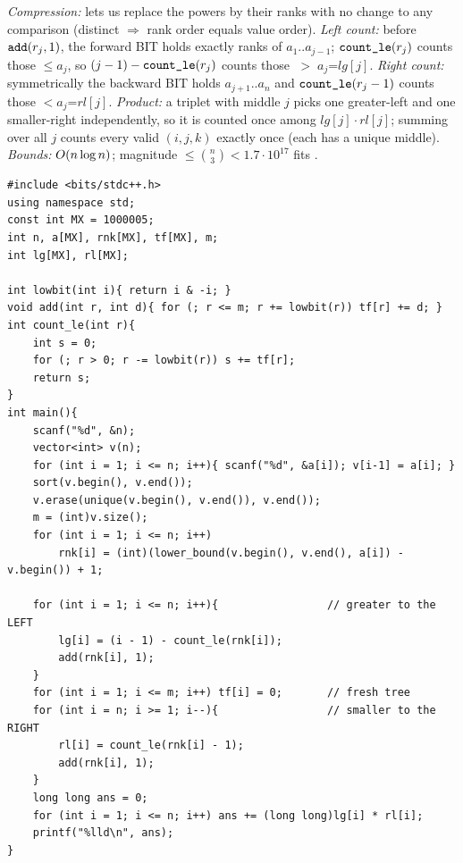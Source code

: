 \begin{proofbox}
\emph{Compression:}  lets us replace the powers by
their ranks with no change to any comparison (distinct \(\Rightarrow\) rank
order equals value order).  \emph{Left count:} before \(\texttt{add}(r_j,1)\),
the forward BIT holds exactly ranks of \(a_1..a_{j-1}\); \(\texttt{count\_le}(r_j)\)
counts those \(\le a_j\), so \((j-1)-\texttt{count\_le}(r_j)\) counts those
\(\;>\;a_j\)=\(\mathit{lg}[j]\).  \emph{Right count:} symmetrically the
backward BIT holds \(a_{j+1}..a_n\) and \(\texttt{count\_le}(r_j-1)\) counts
those \(<a_j\)=\(\mathit{rl}[j]\).  \emph{Product:} a triplet with middle
\(j\) picks one greater-left and one smaller-right independently, so it is
counted once among \(\mathit{lg}[j]\cdot\mathit{rl}[j]\); summing over all
\(j\) counts every valid \((i,j,k)\) exactly once (each has a unique middle).
\emph{Bounds:} \(O(n\log n)\); magnitude \(\le\binom{n}{3}<1.7\cdot10^{17}\)
fits .
\end{proofbox}

\begin{lstlisting}[caption={CF 61E full solution: two frequency-BIT sweeps around the middle index}, label={lst:c14-61-soln}]
#include <bits/stdc++.h>
using namespace std;
const int MX = 1000005;
int n, a[MX], rnk[MX], tf[MX], m;
int lg[MX], rl[MX];

int lowbit(int i){ return i & -i; }
void add(int r, int d){ for (; r <= m; r += lowbit(r)) tf[r] += d; }
int count_le(int r){
    int s = 0;
    for (; r > 0; r -= lowbit(r)) s += tf[r];
    return s;
}
int main(){
    scanf("%d", &n);
    vector<int> v(n);
    for (int i = 1; i <= n; i++){ scanf("%d", &a[i]); v[i-1] = a[i]; }
    sort(v.begin(), v.end());
    v.erase(unique(v.begin(), v.end()), v.end());
    m = (int)v.size();
    for (int i = 1; i <= n; i++)
        rnk[i] = (int)(lower_bound(v.begin(), v.end(), a[i]) - v.begin()) + 1;

    for (int i = 1; i <= n; i++){                 // greater to the LEFT
        lg[i] = (i - 1) - count_le(rnk[i]);
        add(rnk[i], 1);
    }
    for (int i = 1; i <= m; i++) tf[i] = 0;       // fresh tree
    for (int i = n; i >= 1; i--){                 // smaller to the RIGHT
        rl[i] = count_le(rnk[i] - 1);
        add(rnk[i], 1);
    }
    long long ans = 0;
    for (int i = 1; i <= n; i++) ans += (long long)lg[i] * rl[i];
    printf("%lld\n", ans);
}
\end{lstlisting}

